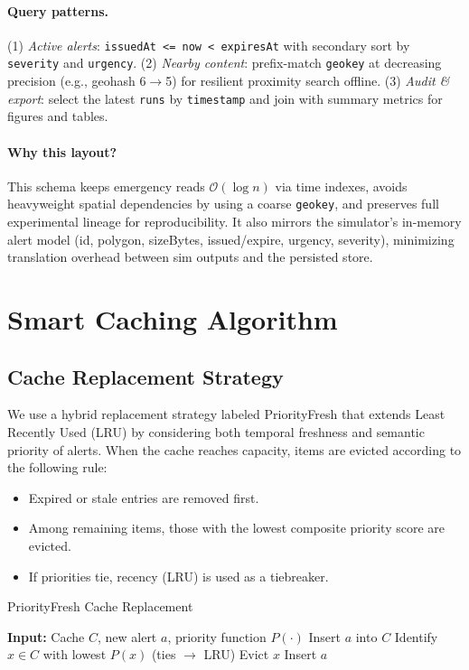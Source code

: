 \documentclass[11pt,twocolumn]{article}
\begin{document}
\paragraph{Query patterns.}
(1) \emph{Active alerts}: \texttt{issuedAt <= now < expiresAt} with secondary sort by \texttt{severity} and \texttt{urgency}. (2) \emph{Nearby content}: prefix-match \texttt{geokey} at decreasing precision (e.g., geohash 6$\rightarrow$5) for resilient proximity search offline. (3) \emph{Audit \& export}: select the latest \texttt{runs} by \texttt{timestamp} and join with summary metrics for figures and tables.

\paragraph{Why this layout?}
This schema keeps emergency reads $\mathcal{O}(\log n)$ via time indexes, avoids heavyweight spatial dependencies by using a coarse \texttt{geokey}, and preserves full experimental lineage for reproducibility. It also mirrors the simulator’s in-memory alert model (id, polygon, sizeBytes, issued/expire, urgency, severity), minimizing translation overhead between sim outputs and the persisted store.

\section{Smart Caching Algorithm}

\subsection{Cache Replacement Strategy}

We use a hybrid replacement strategy labeled PriorityFresh that extends Least Recently Used (LRU) by considering both temporal freshness and semantic priority of alerts. When the cache reaches capacity, items are evicted according to the following rule: 
\begin{itemize}
    \item Expired or stale entries are removed first.
    \item Among remaining items, those with the lowest composite priority score are evicted.
    \item If priorities tie, recency (LRU) is used as a tiebreaker.
\end{itemize}

\begin{algorithm}[h]
\caption{PriorityFresh Cache Replacement}
\begin{algorithmic}[1]
\STATE \textbf{Input:} Cache $C$, new alert $a$, priority function $P(\cdot)$
    \STATE Insert $a$ into $C$
\ELSE
    \STATE Identify $x \in C$ with lowest $P(x)$ (ties $\rightarrow$ LRU)
    \STATE Evict $x$
    \STATE Insert $a$
\ENDIF
\end{algorithmic}
\end{algorithm}
\end{document}
